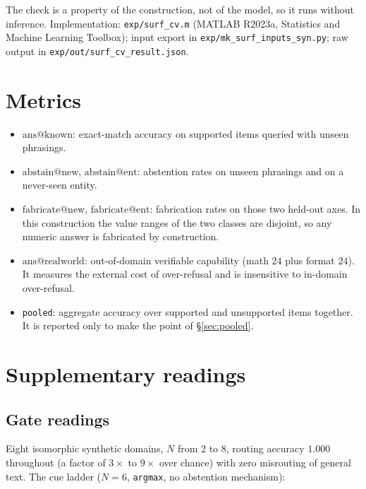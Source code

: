 \documentclass[11pt,a4paper]{article}
\begin{document}
The check is a property of the construction, not of the model, so it runs
without inference. Implementation: \texttt{exp/surf\_cv.m} (MATLAB R2023a,
Statistics and Machine Learning Toolbox); input export in
\texttt{exp/mk\_surf\_inputs\_syn.py}; raw output in
\texttt{exp/out/surf\_cv\_result.json}.

\section{Metrics}
\label{app:metrics}

\begin{itemize}[leftmargin=1.4em,itemsep=1pt]
\item $\mathrm{ans}@\text{known}$: exact-match accuracy on supported items
      queried with unseen phrasings.
\item $\mathrm{abstain}@\text{new}$, $\mathrm{abstain}@\text{ent}$: abstention
      rates on unseen phrasings and on a never-seen entity.
\item $\mathrm{fabricate}@\text{new}$, $\mathrm{fabricate}@\text{ent}$:
      fabrication rates on those two held-out axes. In this construction the
      value ranges of the two classes are disjoint, so any numeric answer is
      fabricated by construction.
\item $\mathrm{ans}@\text{realworld}$: out-of-domain verifiable capability
      (math $24$ plus format $24$). It measures the external cost of
      over-refusal and is insensitive to in-domain over-refusal.
\item \texttt{pooled}: aggregate accuracy over supported and unsupported items
      together. It is reported only to make the point of \S\ref{sec:pooled}.
\end{itemize}

\section{Supplementary readings}
\label{app:readings}

\subsection{Gate readings}
\label{app:gate}

Eight isomorphic synthetic domains, $N$ from $2$ to $8$, routing accuracy
$1.000$ throughout (a factor of $3\times$ to $9\times$ over chance) with zero
misrouting of general text. The cue ladder ($N=6$, \texttt{argmax}, no
abstention mechanism):
\end{document}
